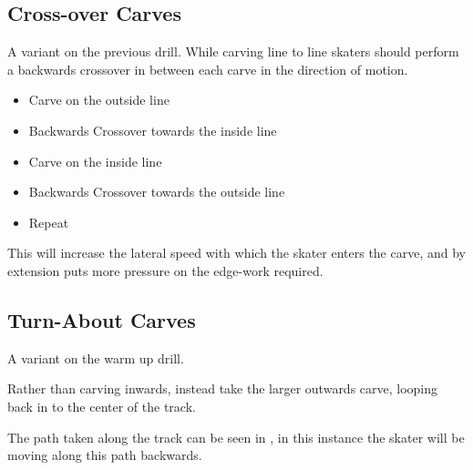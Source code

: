 \subsection*{Cross-over Carves}

A variant on the previous drill. 
While carving line to line skaters should perform a backwards crossover in between each carve in the direction of motion.

\begin{itemize}
    \item Carve on the outside line
    \item Backwards Crossover towards the inside line 
    \item Carve on the inside line
    \item Backwards Crossover towards the outside line
    \item Repeat 
\end{itemize}

This will increase the lateral speed with which the skater enters the carve, and by extension puts more pressure on the edge-work required.      

\subsection*{Turn-About Carves}

A variant on the warm up drill.

Rather than carving inwards, instead take the larger outwards carve, looping back in to the center of the track. 

The path taken along the track can be seen in , in this instance the skater will be moving along this path backwards. 
